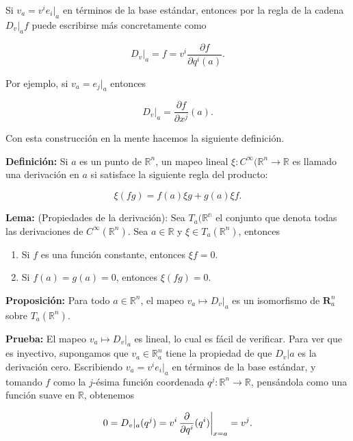 \documentclass[a4paper,10pt]{article}
\numberwithin{equation}{section}
\newcommand{\zerodel}{.\kern-\nulldelimiterspace}
\newcommand{\definicion}{\textbf{Definición: }}
\newcommand{\lema}{\textbf{Lema: }}
\newcommand{\prueba}{\textbf{Prueba: }}
\newcommand{\proposicion}{\textbf{Proposición: }}
\begin{document}
Si $v_a = v^ie_i|_a$ en términos de la base estándar, entonces por la regla de la 
cadena $D_v|_a f$ puede escribirse más concretamente como 

\begin{equation}
 D_v|_a = f = v^i\frac{\partial f}{\partial q^i (a)}.
\end{equation}

Por ejemplo, si $v_a = e_j|_a$ entonces 

\begin{equation}
 D_v|_a = \frac{\partial f}{\partial x^j}(a).
\end{equation}

Con esta construcción en la mente hacemos la siguiente definición. 

\vspace{.3cm}

\definicion Si $a$ es un punto de $\mathbb{R}^n$, un mapeo lineal
$\xi:C^{\infty}(\mathbb{R}^n \rightarrow \mathbb{R}$ es llamado una derivación 
en $a$ si satisface la siguiente regla del producto:

\begin{equation}
 \xi(fg) = f(a)\xi g + g(a)\xi f.
\end{equation}

\lema (Propiedades de la derivación): Sea $T_a(\mathbb{R^n}$ el conjunto que denota todas las derivaciones de $C^{\infty}(\mathbb{R}^n)$.
Sea $a \in \mathbb{R}$ y $\xi \in T_a(\mathbb{R}^n)$, entonces 

\begin{enumerate}[label=(\alph*)]
 \item Si $f$ es una función constante, entonces $\xi f = 0$.
 \item Si $f(a) = g(a) = 0$, entonces $\xi(fg) = 0$. 
\end{enumerate}

\proposicion Para todo $a \in \mathbb{R}^n$, el mapeo $v_a \mapsto D_v|_a$ es 
un isomorfismo de $\mathbf{R}^n_a$ sobre $T_a(\mathbb{R}^n)$.

\prueba El mapeo  $v_a \mapsto D_v|_a$ es lineal, lo cual es fácil de verificar. 
Para ver que es inyectivo, supongamos que $v_a \in \mathbb{R}^n_a$ tiene 
la propiedad de que $D_v|a$ es la derivación cero. Escribiendo $v_a = v^ie_i|_a$
en términos de la base estándar, y tomando $f$ como la $j$-ésima función 
coordenada $q^j: \mathbb{R}^n \rightarrow \mathbb{R}$, pensándola como 
una función suave en $\mathbb{R}$, obtenemos 

\begin{equation}
 0 = D_v|_a (q^j) = v^i \left\zerodel\frac{\partial}{\partial q^i}(q^i)\right|_{x=a} = v^j.
\end{equation}
\end{document}
